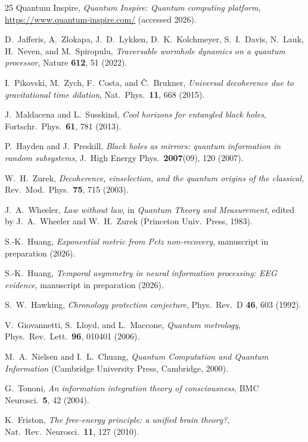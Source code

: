 \documentclass[prl,twocolumn,superscriptaddress,longbibliography,floatfix]{revtex4-2}
\begin{document}
\begin{thebibliography}{25}
Quantum Inspire,
\textit{Quantum Inspire: Quantum computing platform},
\url{https://www.quantum-inspire.com/} (accessed 2026).

D.~Jafferis, A.~Zlokapa, J.~D.~Lykken, D.~K.~Kolchmeyer,
S.~I.~Davis, N.~Lauk, H.~Neven, and M.~Spiropulu,
\textit{Traversable wormhole dynamics on a quantum processor},
Nature \textbf{612}, 51 (2022).

I.~Pikovski, M.~Zych, F.~Costa, and \v{C}.~Brukner,
\textit{Universal decoherence due to gravitational time dilation},
Nat.\ Phys.\ \textbf{11}, 668 (2015).

J.~Maldacena and L.~Susskind,
\textit{Cool horizons for entangled black holes},
Fortschr.\ Phys.\ \textbf{61}, 781 (2013).

P.~Hayden and J.~Preskill,
\textit{Black holes as mirrors: quantum information in random
subsystems},
J.\ High Energy Phys.\ \textbf{2007}(09), 120 (2007).

W.~H.~Zurek,
\textit{Decoherence, einselection, and the quantum origins of the
classical},
Rev.\ Mod.\ Phys.\ \textbf{75}, 715 (2003).

J.~A.~Wheeler,
\textit{Law without law},
in \textit{Quantum Theory and Measurement},
edited by J.~A.~Wheeler and W.~H.~Zurek (Princeton Univ.\ Press,
1983).

S.-K.~Huang,
\textit{Exponential metric from Petz non-recovery},
manuscript in preparation (2026).

S.-K.~Huang,
\textit{Temporal asymmetry in neural information processing:
EEG evidence},
manuscript in preparation (2026).

S.~W.~Hawking,
\textit{Chronology protection conjecture},
Phys.\ Rev.\ D \textbf{46}, 603 (1992).

V.~Giovannetti, S.~Lloyd, and L.~Maccone,
\textit{Quantum metrology},
Phys.\ Rev.\ Lett.\ \textbf{96}, 010401 (2006).

M.~A.~Nielsen and I.~L.~Chuang,
\textit{Quantum Computation and Quantum Information}
(Cambridge University Press, Cambridge, 2000).

G.~Tononi,
\textit{An information integration theory of consciousness},
BMC Neurosci.\ \textbf{5}, 42 (2004).

K.~Friston,
\textit{The free-energy principle: a unified brain theory?},
Nat.\ Rev.\ Neurosci.\ \textbf{11}, 127 (2010).

\end{thebibliography}
\end{document}
